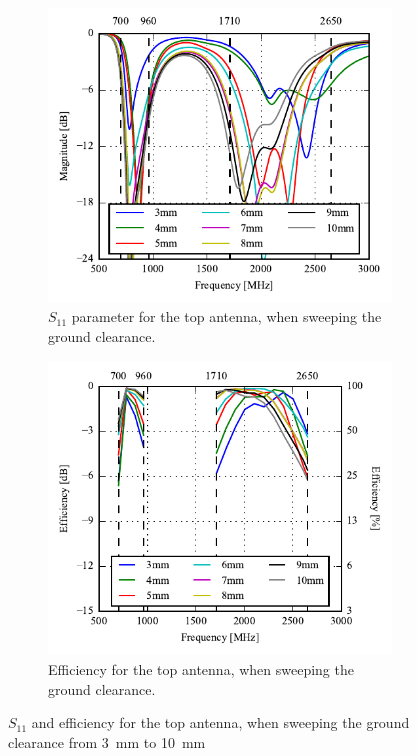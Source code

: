 \begin{figure}[htbp]
   \begin{subfigure}[b]{0.49\linewidth}
        \centering
        \includegraphics{img/tech_sol/monopole/5mm/s11_5mm}
        \caption{$S_{11}$ parameter for the top antenna, when sweeping the ground clearance.}
        \label{fig:s11_mono_sim_5mm}
    \end{subfigure}
    \hfill
    \begin{subfigure}[b]{0.49\linewidth}
        \centering
        \includegraphics{img/tech_sol/monopole/5mm/eff_5mm}
        \caption{Efficiency for the top antenna, when sweeping the ground clearance.}
        \label{fig:eff_mono_sim_5mm}
    \end{subfigure}
    \caption{$S_{11}$ and efficiency for the top antenna, when sweeping the ground clearance from \SI{3}{mm} to \SI{10}{mm}}
    \label{fig:eff_s11_mono_sim_5mm}
\end{figure}

